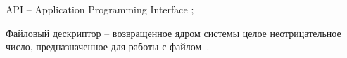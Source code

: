 
API -- Application Programming Interface \cite{masse-api-2012};

Файловый дескриптор -- возвращенное ядром системы целое неотрицательное число, предназначенное для работы с файлом~\cite{stevens}.